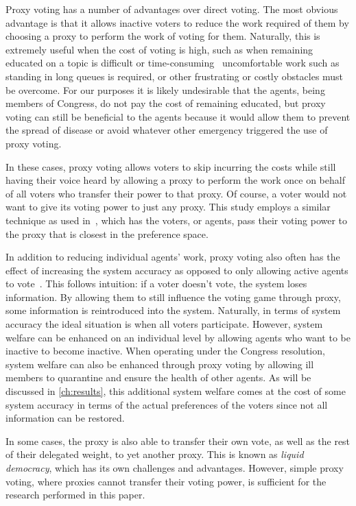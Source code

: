 Proxy voting has a number of advantages over direct voting.
The most obvious advantage is that it allows inactive voters to reduce the work
required of them by choosing a proxy to perform the work of voting for them.
Naturally, this is extremely useful when the cost of voting is high, such as
when remaining educated on a topic is difficult or
time-consuming~\cite{Mueller1972} uncomfortable work such as standing in
long queues is required, or other frustrating or costly obstacles must be overcome.
For our purposes it is likely undesirable that the agents, being members of Congress,
do not pay the cost of remaining educated, but proxy voting can still be beneficial
to the agents because it would allow them to prevent the spread of disease or avoid
whatever other emergency triggered the use of proxy voting.

In these cases, proxy voting allows voters to skip incurring the costs while
still having their voice heard by allowing a proxy to perform the work once on
behalf of all voters who transfer their power to that proxy.
Of course, a voter would not want to give its voting power to just any proxy.
This study employs a similar technique as used in~\cite{Cohensius2017}, which has the
voters, or agents, pass their voting power to the proxy that is closest in the
preference space.

In addition to reducing individual agents' work, proxy voting also often has
the effect of increasing the system accuracy as opposed to only allowing active
agents to vote~\cite{Cohensius2017}.
This follows intuition: if a voter doesn't vote, the system loses information.
By allowing them to still influence the voting game through proxy, some information
is reintroduced into the system.
Naturally, in terms of system accuracy the ideal situation is when all voters
participate.
However, system welfare can be enhanced on an individual level by allowing agents
who want to be inactive to become inactive.
When operating under the Congress resolution, system welfare can also be enhanced
through proxy voting by allowing ill members to quarantine and ensure the health
of other agents.
As will be discussed in \autoref{ch:results}, this additional system welfare comes at
the cost of some system accuracy in terms of the actual preferences of the voters
since not all information can be restored.

In some cases, the proxy is also able to transfer their own vote, as well as the rest of
their delegated weight, to yet another proxy.
This is known as \textit{liquid democracy}, which has its own challenges and
advantages.
However, simple proxy voting, where proxies cannot transfer their voting power,
is sufficient for the research performed in this paper.


